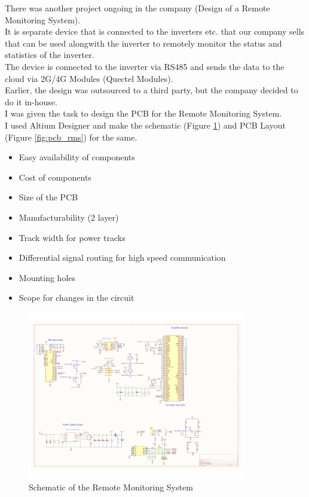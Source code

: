 There was another project ongoing in the company (Design of a Remote Monitoring System).\\
\noindent
It is separate device that is connected to the inverters etc. that our company sells that can be used alongwith the inverter to remotely monitor the status and statistics of the inverter.\\
\noindent
The device is connected to the inverter via RS485 and sends the data to the cloud via 2G/4G Modules (Quectel Modules).\\
\noindent
Earlier, the design was outsourced to a third party, but the company decided to do it in-house.\\
\noindent
I was given the task to design the PCB for the Remote Monitoring System.\\
\noindent
I used Altium Designer and make the schematic (Figure \ref{fig:schematic_rms}) and PCB Layout (Figure \ref{fig:pcb_rms}) for the same.
\begin{multicols}{2}
\begin{itemize}
    \item Easy availability of components
    \item Cost of components
    \item Size of the PCB
    \item Manufacturability (2 layer)
    \item Track width for power tracks
    \item Differential signal routing for high speed communication
    \item Mounting holes
    \item Scope for changes in the circuit
\end{itemize}
\end{multicols}
\begin{figure}[H]
    \centering
    \includegraphics[width=0.85\textwidth]{images/schematic.png}
    \caption{Schematic of the Remote Monitoring System}
    \label{fig:schematic_rms}
\end{figure}
